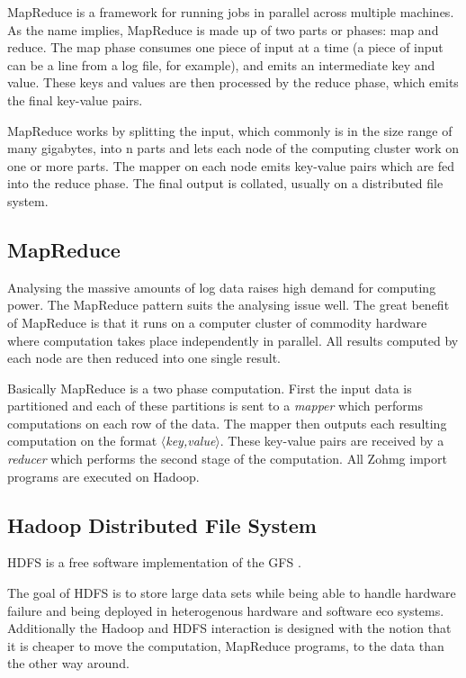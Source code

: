 \documentclass[a4paper,10pt]{book}
\begin{document}
MapReduce is a framework for running jobs in parallel across multiple
machines. As the name implies, MapReduce is made up of two parts or
phases: map and reduce. The map phase consumes one piece of input at a
time (a piece of input can be a line from a log file, for example), and
emits an intermediate key and value. These keys and values are then
processed by the reduce phase, which emits the final key-value pairs.

MapReduce works by splitting the input, which commonly is in the size
range of many gigabytes, into n parts and lets each node of the computing
cluster work on one or more parts. The mapper on each node emits key-value
pairs which are fed into the reduce phase. The final output is collated,
usually on a distributed file system.


\subsection{MapReduce}

Analysing the massive amounts of log data raises high demand for computing
power. The MapReduce \cite{mapreduce} pattern suits the analysing issue
well. The great benefit of MapReduce is that it runs on a computer cluster
of commodity hardware where computation takes place independently in
parallel. All results computed by each node are then reduced into one
single result.

Basically MapReduce is a two phase computation. First the input data is
partitioned and each of these partitions is sent to a \textit{mapper} which
performs computations on each row of the data. The mapper then outputs each
resulting computation on the format $\langle$\textit{key,value}$\rangle$. These
key-value pairs are received by a \textit{reducer} which performs the second
stage of the computation.
All Zohmg import programs are executed on Hadoop.


\subsection{Hadoop Distributed File System}

HDFS is a free software implementation of the GFS \cite{gfs}.

The goal of HDFS is to store large data sets while being able to handle
hardware failure and being deployed in heterogenous hardware and software
eco systems. Additionally the Hadoop and HDFS interaction is designed with
the notion that it is cheaper to move the computation, MapReduce programs,
to the data than the other way around.
\end{document}
